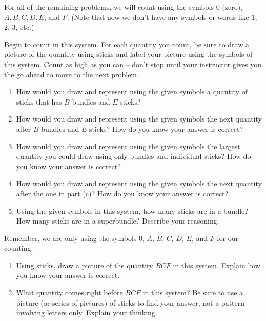 \documentclass{ximera}
\begin{document}
\newpage

For all of the remaining problems, we will count using the symbols $0$ (zero), $A, B, C, D, E$, and $F$. (Note that now we don't have any symbols or words like $1$, $2$, $3$, etc.)

\begin{problem}

Begin to count in this system. For each quantity you count, be sure to draw a picture of the quantity using sticks and label your picture using the symbols of this system. Count as high as you can -- don't stop until your instructor gives you the go ahead to move to the next problem. 

\end{problem}


\begin{problem}
\begin{enumerate}
	\item How would you draw and represent using the given symbols a quantity of sticks that has $B$ bundles and $E$ sticks?
	\item How would you draw and represent using the given symbols the next quantity after $B$ bundles and $E$ sticks? How do you know your answer is correct?
	\item How would you draw and represent using the given symbols the largest quantity you could draw using only bundles and individual sticks? How do you know your answer is correct?
	\item How would you draw and represent using the given symbols the next quantity after the one in part (c)? How do you know your answer is correct?
	\item Using the given symbols in this system, how many sticks are in a bundle? How many sticks are in a superbundle? Describe your reasoning. 
\end{enumerate}
\end{problem}

\newpage

Remember, we are only using the symbols $0$, $A$, $B$, $C$, $D$, $E$, and $F$ for our counting.

\begin{problem}
\begin{enumerate}
	\item Using sticks, draw a picture of the quantity $BCF$ in this system. Explain how you know your answer is correct.
	\item What quantity comes right before $BCF$ in this system? Be sure to use a picture (or series of pictures) of sticks to find your answer, not a pattern involving letters only. Explain your thinking.
\end{enumerate}
\end{problem}
\end{document}

